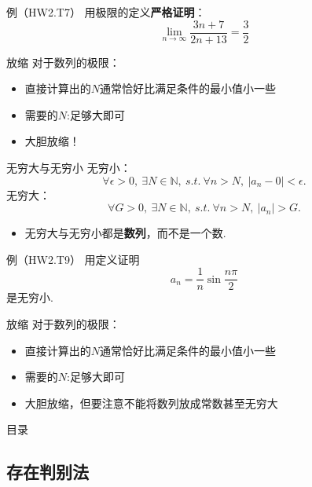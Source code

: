 \documentclass[]{beamer}
\begin{document}
\begin{frame}{例（HW2.T7）}
    用极限的定义\textbf{严格证明}：
    \[
    \lim_{n\rightarrow\infty}\frac{3n+7}{2n+13}=\frac32
    \]
\end{frame}

\begin{frame}{放缩}
    对于数列的极限：
    \begin{itemize}
        \item 直接计算出的$N$通常恰好比满足条件的最小值小一些
        \item 需要的$N$:足够大即可
        \item 大胆放缩！
    \end{itemize}
\end{frame}

\begin{frame}{无穷大与无穷小}
    无穷小：
    \[
    \forall \epsilon >0,\ \exists N\in \mathbb{N},\ s.t.\ \forall n>N,\ |a_n-0|<\epsilon.
    \]
    无穷大：
    \[
    \forall G >0,\ \exists N\in \mathbb{N},\ s.t.\ \forall n>N,\ |a_n|>G.
    \]
    \begin{itemize}
        \item 无穷大与无穷小都是\textbf{数列}，而不是一个数.
    \end{itemize}
\end{frame}

\begin{frame}{例（HW2.T9）}
    用定义证明
    \[
    a_n=\frac1n\sin\frac{n\pi}2
    \]
    是无穷小.
\end{frame}

\begin{frame}{放缩}
    对于数列的极限：
    \begin{itemize}
        \item 直接计算出的$N$通常恰好比满足条件的最小值小一些
        \item 需要的$N$:足够大即可
        \item 大胆放缩，但要注意不能将数列放成常数甚至无穷大
    \end{itemize}
\end{frame}

\begin{frame}{目录}
    \tableofcontents[currentsection]
\end{frame}

\subsection{存在判别法}
\end{document}
